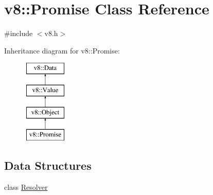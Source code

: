 \hypertarget{classv8_1_1Promise}{}\section{v8\+:\+:Promise Class Reference}
\label{classv8_1_1Promise}


{\ttfamily \#include $<$v8.\+h$>$}

Inheritance diagram for v8\+:\+:Promise\+:\begin{figure}[H]
\begin{center}
\leavevmode
\includegraphics[height=4.000000cm]{classv8_1_1Promise}
\end{center}
\end{figure}
\subsection*{Data Structures}
\begin{DoxyCompactItemize}
\item 
class \hyperlink{classv8_1_1Promise_1_1Resolver}{Resolver}
\end{DoxyCompactItemize}
